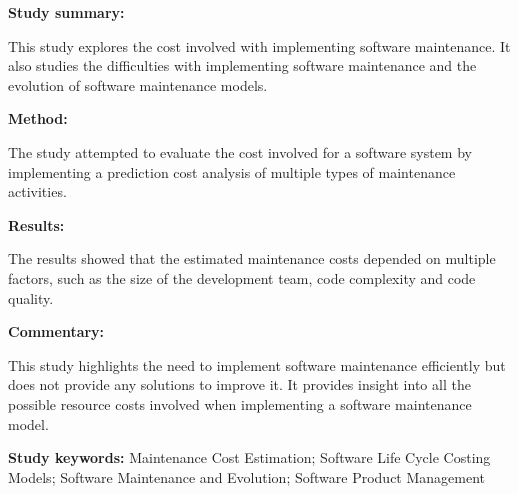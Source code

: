 \begin{tcolorbox}[colback=gray!5!white, colframe=pastelgreen!40!black, title=A cost model for software maintenance \& evolution\cite{Sneed2004}]
	\begin{minipage}[t]{0.25\textwidth}
		\textbf{Study summary:}
	\end{minipage}
	\hfill
	\begin{minipage}[t]{0.65\textwidth}
		This study explores the cost involved with implementing software maintenance. It also
		studies the difficulties with implementing software maintenance and the evolution of
		software maintenance models. 
	\end{minipage}

	\vspace{0.75em} 

	\begin{minipage}[t]{0.25\textwidth}
		\textbf{Method:}
	\end{minipage}
	\hfill
	\begin{minipage}[t]{0.65\textwidth}
		The study attempted to evaluate the cost involved for a software system by implementing a prediction cost analysis of multiple types of maintenance activities.
	\end{minipage}

	\vspace{0.75em} 

	\begin{minipage}[t]{0.25\textwidth}
		\textbf{Results:}
	\end{minipage}
	\hfill
	\begin{minipage}[t]{0.65\textwidth}
		The results showed that the estimated maintenance costs depended on multiple factors, such as the size of the development team, code complexity and code quality.
	\end{minipage}

	\vspace{0.75em} 

	\begin{minipage}[t]{0.25\textwidth}
		\textbf{Commentary:}
	\end{minipage}
	\hfill
	\begin{minipage}[t]{0.65\textwidth}
		This study highlights the need to implement software maintenance efficiently but does not provide any solutions to improve it. It provides insight into all the possible resource costs involved when implementing a software maintenance model.
	\end{minipage}
	\tcblower
	\textbf{Study keywords:} Maintenance Cost Estimation; Software Life Cycle Costing Models;
	Software Maintenance and Evolution; Software Product Management
\end{tcolorbox}


